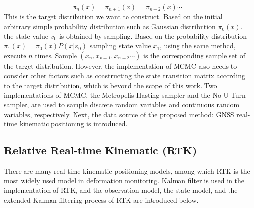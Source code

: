 \documentclass[final,3p,times]{elsarticle}
\begin{document}
	\begin{equation}\label{eq_markov_chain_3}
	\pi_{n}(x)=\pi_{n+1}(x)=\pi_{n+2}(x)\cdots
	\end{equation}
	This is the target distribution we want to construct. Based on the initial arbitrary simple probability distribution such as Gaussian distribution $\pi_{0}(x)$, the state value $x_0$ is obtained by sampling. Based on the probability distribution $\pi_{1}(x)=\pi_{0}(x)P(x\left| {{x_0}} \right.)$ sampling state value $x_1$, using the same method, execute $n$ times. Sample $(x_{n},x_{n+1},x_{n+2}\cdots)$ is the corresponding sample set of the target distribution. However, the implementation of MCMC also needs to consider other factors such as constructing the state transition matrix according to the target distribution\cite{robert2013monte}, which is beyond the scope of this work. Two implementations of MCMC,  the Metropolis-Hasting sampler\cite{chib1995understanding} and the No-U-Turn sampler\cite{hoffman2014no}, are used to sample discrete random variables and continuous random variables, respectively. Next, the data source of the proposed method: GNSS real-time kinematic positioning is introduced.
	
	\subsection{Relative Real-time Kinematic (RTK)}
	There are many real-time kinematic positioning models, among which RTK is the most widely used model in deformation monitoring.
	Kalman filter is used in the implementation of  RTK, and the observation model, the state model, and the extended Kalman filtering process of RTK are introduced below. 
\end{document}

